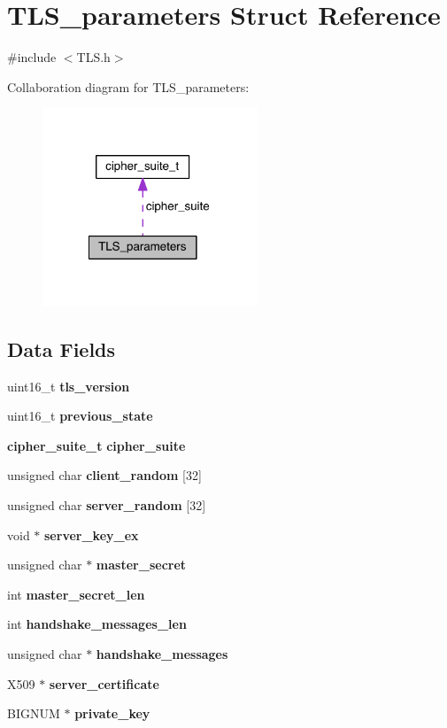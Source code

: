 \section{T\+L\+S\+\_\+parameters Struct Reference}
\label{struct_t_l_s__parameters}


{\ttfamily \#include $<$T\+L\+S.\+h$>$}



Collaboration diagram for T\+L\+S\+\_\+parameters\+:\nopagebreak
\begin{figure}[H]
\begin{center}
\leavevmode
\includegraphics[width=182pt]{struct_t_l_s__parameters__coll__graph}
\end{center}
\end{figure}
\subsection*{Data Fields}
\begin{DoxyCompactItemize}
\item 
uint16\+\_\+t {\bf tls\+\_\+version}
\item 
uint16\+\_\+t {\bf previous\+\_\+state}
\item 
{\bf cipher\+\_\+suite\+\_\+t} {\bf cipher\+\_\+suite}
\item 
unsigned char {\bf client\+\_\+random} [32]
\item 
unsigned char {\bf server\+\_\+random} [32]
\item 
void $\ast$ {\bf server\+\_\+key\+\_\+ex}
\item 
unsigned char $\ast$ {\bf master\+\_\+secret}
\item 
int {\bf master\+\_\+secret\+\_\+len}
\item 
int {\bf handshake\+\_\+messages\+\_\+len}
\item 
unsigned char $\ast$ {\bf handshake\+\_\+messages}
\item 
X509 $\ast$ {\bf server\+\_\+certificate}
\item 
B\+I\+G\+N\+UM $\ast$ {\bf private\+\_\+key}
\end{DoxyCompactItemize}


